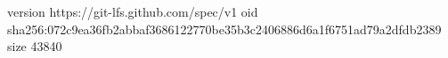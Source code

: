 version https://git-lfs.github.com/spec/v1
oid sha256:072c9ea36fb2abbaf3686122770be35b3c2406886d6a1f6751ad79a2dfdb2389
size 43840
